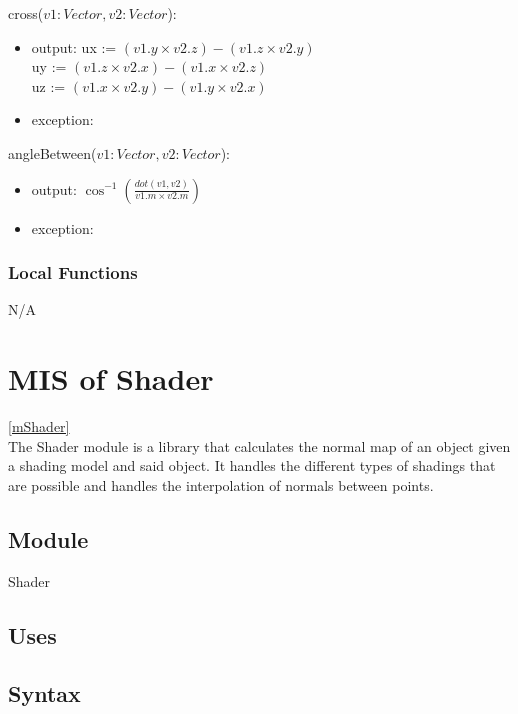 \documentclass[12pt, titlepage]{article}
\begin{document}
\noindent cross($v1:Vector, v2:Vector$):
\begin{itemize}
	\item output: 
	ux := $(v1.y \times v2.z) - (v1.z \times v2.y)$  \\
	uy := $(v1.z \times v2.x) - (v1.x \times v2.z)$  \\
	uz := $(v1.x \times v2.y) - (v1.y \times v2.x)$  \\
	\item exception: \\
\end{itemize}

\noindent angleBetween($v1:Vector, v2:Vector$):
\begin{itemize}
	\item output: $\cos^{-1}(\frac{dot(v1, v2)}{v1.m \times v2.m})$
	\item exception: \\
\end{itemize}

\subsubsection{Local Functions}
N/A

\newpage

\section{MIS of Shader} \ref{mShader} \\
The Shader module is a library that calculates the normal map of an object 
given a shading model and said object. It handles the different types of 
shadings that are possible and handles the interpolation of normals between 
points.

\subsection{Module}
Shader

\subsection{Uses}

\subsection{Syntax}
\end{document}
